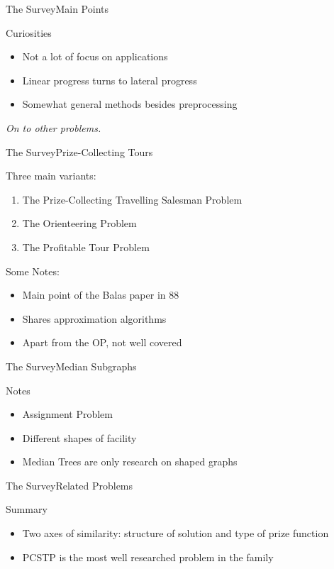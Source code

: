 \documentclass[rgb,dvipsnames]{beamer}
\begin{document}
\begin{frame}{The Survey}{Main Points}
  \begin{block}{Curiosities} \pause
  \begin{itemize}
  \item Not a lot of focus on applications
  \item Linear progress turns to lateral progress
  \item Somewhat general methods besides preprocessing
  \end{itemize}
\end{block}
\pause
\textit{On to other problems.}
\end{frame}

\begin{frame}{The Survey}{Prize-Collecting Tours}
  \begin{block}{Three main variants:}
    \begin{enumerate}
    \item The Prize-Collecting Travelling Salesman Problem
    \item The Orienteering Problem
    \item The Profitable Tour Problem
    \end{enumerate}
  \end{block}
  \pause
  \begin{block}{Some Notes:}
  \begin{itemize}
  \item Main point of the Balas paper in 88
  \item Shares approximation algorithms
  \item Apart from the OP, not well covered
  \end{itemize}
\end{block}

\end{frame}

\begin{frame}{The Survey}{Median Subgraphs}
  \begin{block}{Notes}
    \begin{itemize}
    \item Assignment Problem
    \item Different shapes of facility
    \item Median Trees are only research on shaped graphs
  \end{itemize}
\end{block}
\end{frame}

\begin{frame}{The Survey}{Related Problems}
  \begin{block}{Summary}
  \begin{itemize}
  \item Two axes of similarity: structure of solution and type of prize function
  \item PCSTP is the most well researched problem in the family
  \end{itemize}
\end{block}
\end{frame}
\end{document}
